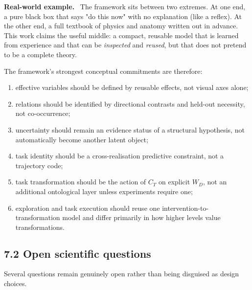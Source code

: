 \documentclass[11pt]{article}
\newenvironment{example}{%
  \par\smallskip\noindent\begin{minipage}{\textwidth}%
  \color{teal!60!black}\small
  \textbf{\color{teal!70!black}Real-world example.}\
}{%
  \end{minipage}\par\smallskip}
\begin{document}
\begin{example}
The framework sits between two extremes. At one end, a pure black box that says "do this now" with no explanation (like a reflex).
At the other end, a full textbook of physics and anatomy written out in advance. This work claims the useful middle: a compact,
reusable model that is learned from experience and that can be \emph{inspected} and \emph{reused}, but that does not pretend to be a
complete theory.
\end{example}

The framework's strongest conceptual commitments are therefore:

\begin{enumerate}
\item effective variables should be defined by reusable effects, not visual axes alone;
\item relations should be identified by directional contrasts and held-out necessity, not co-occurrence;
\item uncertainty should remain an evidence status of a structural hypothesis, not automatically become another latent object;
\item task identity should be a cross-realisation predictive constraint, not a trajectory code;
\item task transformation should be the action of $C_T$ on explicit $W_D$, not an additional ontological layer unless experiments
require one;
\item exploration and task execution should reuse one intervention-to-transformation model and differ primarily in how higher levels
value transformations.
\end{enumerate}

\subsection*{7.2 Open scientific questions}

Several questions remain genuinely open rather than being disguised as design choices.
\end{document}
